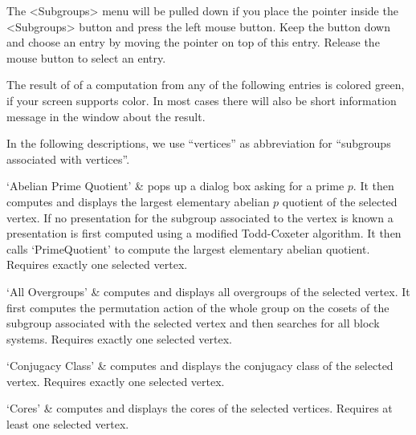 %
%
%


The <Subgroups> menu will be pulled down  if you place the pointer inside
the <Subgroups> button and press the  left mouse button.  Keep the button
down and  choose an entry by  moving  the pointer on   top of this entry.
Release the mouse button to select an entry.

The result of  of  a computation  from any  of  the following entries  is
colored green, if  your screen supports color.   In most cases there will
also be short information message in the {\GAP} window about the result.

In  the following descriptions, we  use ``vertices'' as abbreviation for
``subgroups associated with vertices''.

\beginitems
`Abelian Prime Quotient' &
pops  up a dialog  box asking  for a  prime  $p$.  It  then computes  and
displays the largest elementary   abelian  $p$ quotient of  the  selected
vertex.  If no presentation for the  subgroup associated to the vertex is
known   a presentation is  first computed  using  a modified Todd-Coxeter
algorithm.     It then calls    `PrimeQuotient' to   compute  the largest
elementary abelian quotient.  Requires exactly one selected vertex.

`All Overgroups' &
computes and displays all overgroups  of the selected vertex.  It  first
computes the permutation action of the whole  group on the cosets of the
subgroup associated with  the selected vertex and  then searches  for all
block systems.  Requires exactly one selected vertex.

`Conjugacy Class' &
computes and  displays  the   conjugacy  class of  the   selected vertex.
Requires  exactly  one selected vertex.  

`Cores' &
computes and  displays the cores  of the selected vertices.   Requires at
least one selected vertex.

